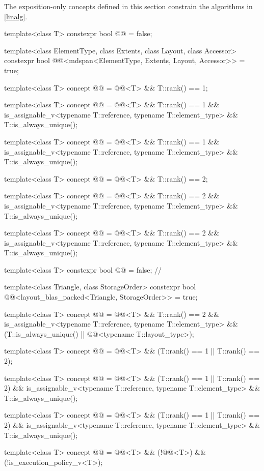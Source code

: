 \pnum
The exposition-only concepts defined in this section
constrain the algorithms in \ref{linalg}.
\begin{codeblock}
template<class T>
  constexpr bool @@ = false;

template<class ElementType, class Extents, class Layout, class Accessor>
  constexpr bool @@<mdspan<ElementType, Extents, Layout, Accessor>> = true;

template<class T>
  concept @@ =
    @@<T> && T::rank() == 1;

template<class T>
  concept @@ =
    @@<T> && T::rank() == 1 &&
    is_assignable_v<typename T::reference, typename T::element_type> && T::is_always_unique();

template<class T>
  concept @@ =
    @@<T> && T::rank() == 1 &&
    is_assignable_v<typename T::reference, typename T::element_type> && T::is_always_unique();

template<class T>
  concept @@ =
    @@<T> && T::rank() == 2;

template<class T>
  concept @@ =
    @@<T> && T::rank() == 2 &&
    is_assignable_v<typename T::reference, typename T::element_type> && T::is_always_unique();

template<class T>
  concept @@ =
    @@<T> && T::rank() == 2 &&
    is_assignable_v<typename T::reference, typename T::element_type> && T::is_always_unique();

template<class T>
  constexpr bool @@ = false;    // \expos

template<class Triangle, class StorageOrder>
  constexpr bool @@<layout_blas_packed<Triangle, StorageOrder>> = true;

template<class T>
  concept @@ =
    @@<T> && T::rank() == 2 &&
    is_assignable_v<typename T::reference, typename T::element_type> &&
    (T::is_always_unique() || @@<typename T::layout_type>);

template<class T>
  concept @@ =
    @@<T> && (T::rank() == 1 || T::rank() == 2);

template<class T>
  concept @@ =
    @@<T> && (T::rank() == 1 || T::rank() == 2) &&
    is_assignable_v<typename T::reference, typename T::element_type> && T::is_always_unique();

template<class T>
  concept @@ =
    @@<T> && (T::rank() == 1 || T::rank() == 2) &&
    is_assignable_v<typename T::reference, typename T::element_type> && T::is_always_unique();

template<class T>
  concept @@ =
    @@<T> && (!@@<T>) && (!is_execution_policy_v<T>);
\end{codeblock}

